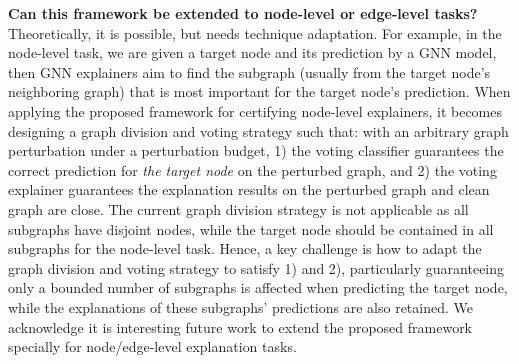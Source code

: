{\bf Can this framework be extended to node-level or edge-level tasks?} Theoretically, it is possible, but needs technique adaptation. For example, in the node-level task, we are given a target node and its prediction by a GNN model, then GNN explainers aim to find the subgraph (usually from the target node’s neighboring graph) that is most important for the target node’s prediction. When applying the proposed framework for certifying node-level explainers, it becomes designing a graph division and voting strategy such that: with an arbitrary graph perturbation under a perturbation budget, 1) the voting classifier guarantees the correct prediction for \emph{the target node} on the perturbed graph, and 2) the voting explainer guarantees the explanation results on the perturbed graph and clean graph are close. The current graph division strategy is not applicable as all subgraphs have disjoint nodes, while the target node should be contained in all subgraphs for the node-level task. Hence, a key challenge is how to adapt the graph division and voting strategy to satisfy 1) and 2), particularly guaranteeing only a bounded number of subgraphs is affected when predicting the target node, while the explanations of these subgraphs' predictions are also retained. We acknowledge it is interesting future work to extend the proposed framework specially for node/edge-level explanation tasks. 


\clearpage
\newpage 
